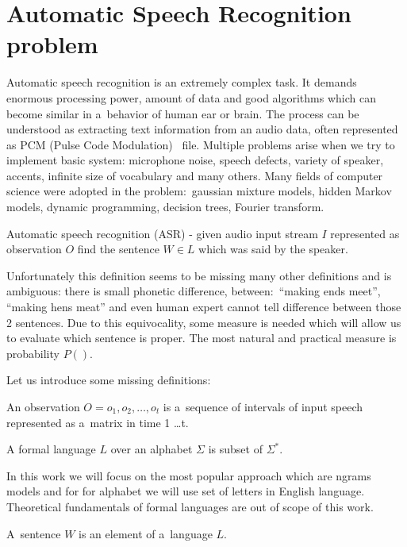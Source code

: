 \chapter{Automatic Speech Recognition problem}
Automatic speech recognition is an extremely complex task. It demands enormous processing power, amount of data and good algorithms which can become similar in a~behavior of human ear or brain. The process can be understood as extracting text information from an audio data, often represented as PCM (Pulse Code Modulation) ~file. Multiple problems arise when we try to implement basic system: microphone noise, speech defects, variety of speaker, accents, infinite size of vocabulary and many others. Many fields of computer science were adopted in the problem:~gaussian mixture models, hidden Markov models, dynamic programming, decision trees, Fourier transform. 

\begin{definition}
	Automatic speech recognition (ASR) - given audio input stream $I$ represented as observation $O$ find the sentence $W\in L$ which was said by the speaker. 
\end{definition}


Unfortunately this definition seems to be missing many other definitions and is ambiguous: there is small phonetic difference, between:~``making ends meet'', ``making hens meat'' and even human expert cannot tell difference between those 2 sentences. Due to this equivocality, some measure is needed which will allow us to evaluate which sentence is proper. The most natural and practical measure is probability $P()$.


Let us introduce some missing definitions:

\begin{definition}
	An observation $O = o_1,o_2,\dots,o_t$ is a~sequence of intervals of input speech represented as a~matrix in time 1 \dots t.
\end{definition}

\begin{definition}
	A formal language $L$ over an alphabet $\Sigma$ is subset of $\Sigma^*$.
\end{definition}

In this work we will focus on the most popular approach which are n\dywiz grams models and for for alphabet we will use set of letters in English language. Theoretical fundamentals of formal languages are out of scope of this work.

\begin{definition}
	A~sentence $W$ is an element of a~language $L$.	
\end{definition}

